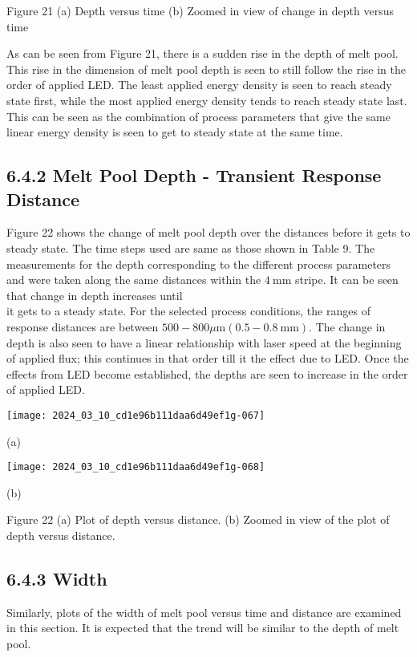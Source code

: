 \documentclass[10pt]{article}
\begin{document}
Figure 21 (a) Depth versus time (b) Zoomed in view of change in depth versus time

As can be seen from Figure 21, there is a sudden rise in the depth of melt pool. This rise in the dimension of melt pool depth is seen to still follow the rise in the order of applied LED. The least applied energy density is seen to reach steady state first, while the most applied energy density tends to reach steady state last. This can be seen as the combination of process parameters that give the same linear energy density is seen to get to steady state at the same time.

\subsection*{6.4.2 Melt Pool Depth - Transient Response Distance}
Figure 22 shows the change of melt pool depth over the distances before it gets to steady state. The time steps used are same as those shown in Table 9. The measurements for the depth corresponding to the different process parameters and were taken along the same distances within the $4 \mathrm{~mm}$ stripe. It can be seen that change in depth increases until\\
it gets to a steady state. For the selected process conditions, the ranges of response distances are between $500-800 \mu \mathrm{m}(0.5-0.8 \mathrm{~mm})$. The change in depth is also seen to have a linear relationship with laser speed at the beginning of applied flux; this continues in that order till it the effect due to LED. Once the effects from LED become established, the depths are seen to increase in the order of applied LED.

\begin{center}
\texttt{[image: 2024\_03\_10\_cd1e96b111daa6d49ef1g-067]}
\end{center}

(a)

\begin{center}
\texttt{[image: 2024\_03\_10\_cd1e96b111daa6d49ef1g-068]}
\end{center}

(b)

Figure 22 (a) Plot of depth versus distance. (b) Zoomed in view of the plot of depth versus distance.

\subsection*{6.4.3 Width}
Similarly, plots of the width of melt pool versus time and distance are examined in this section. It is expected that the trend will be similar to the depth of melt pool.
\end{document}
